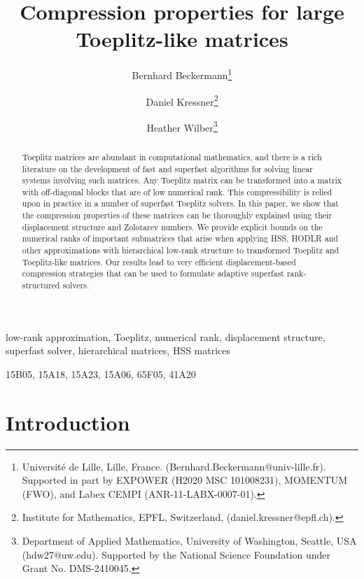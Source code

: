 \documentclass[final,reqno,onefignum,onetabnum]{siamart190516}
\title{Compression properties for large Toeplitz-like matrices}
\author{Bernhard Beckermann\thanks{Universit\'{e} de Lille, Lille, France. (Bernhard.Beckermann@univ-lille.fr). Supported in part by EXPOWER (H2020 MSC 101008231), MOMENTUM (FWO), and Labex CEMPI (ANR-11-LABX-0007-01).} \and
Daniel Kressner\thanks{Institute for Mathematics, EPFL, Switzerland, (daniel.kressner@epfl.ch).} \and
Heather Wilber\thanks{Department of Applied Mathematics, University of Washington, Seattle, USA (hdw27@uw.edu). Supported by the National Science Foundation under Grant No. DMS-2410045.} }
\begin{document}
\maketitle

\begin{abstract} 
Toeplitz matrices are abundant in computational mathematics, and there is a rich literature on the development of fast and superfast algorithms for solving linear systems involving such matrices.
Any Toeplitz matrix can be transformed into a matrix with off-diagonal blocks that are of low numerical rank.
This compressibility is relied upon in practice in a number of superfast Toeplitz solvers. In this paper, we show that the compression properties of these matrices can be thoroughly explained using their displacement structure and Zolotarev numbers. We provide explicit bounds on the numerical ranks of important submatrices that arise when applying HSS, HODLR and other approximations with hierarchical low-rank structure to transformed Toeplitz and Toeplitz-like matrices. Our results lead to very efficient displacement-based compression strategies that can be used to formulate adaptive superfast rank-structured solvers. 
\end{abstract}

\begin{keywords}
low-rank approximation, Toeplitz, numerical rank, displacement structure, superfast solver, hierarchical matrices, HSS matrices
\end{keywords}

\begin{AMS}
15B05, 15A18, 15A23, 15A06, 65F05, 41A20
\end{AMS}


\section{Introduction}
\end{document}
